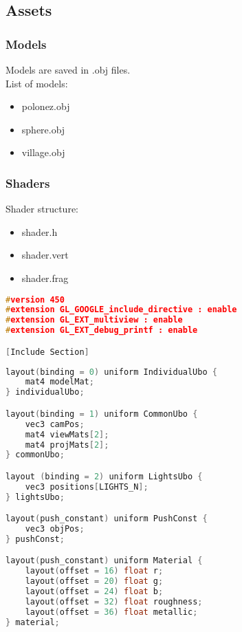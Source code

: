 \subsection{Assets}
\subsubsection{Models}
Models are saved in .obj files.\\
List of models:
\begin{itemize} %
    \item polonez.obj
    \item sphere.obj
    \item village.obj
\end{itemize}
\subsubsection{Shaders}
Shader structure:
\begin{itemize}
    \item shader.h
    \item shader.vert
    \item shader.frag
\end{itemize}

\begin{lstlisting}[language=c++, caption=Common Shader preprocessor]
#version 450
#extension GL_GOOGLE_include_directive : enable
#extension GL_EXT_multiview : enable
#extension GL_EXT_debug_printf : enable

[Include Section]
\end{lstlisting}

\begin{lstlisting}[language=c++, caption=Common Shader data]
layout(binding = 0) uniform IndividualUbo {
    mat4 modelMat;
} individualUbo;

layout(binding = 1) uniform CommonUbo {
    vec3 camPos;
    mat4 viewMats[2];
    mat4 projMats[2];
} commonUbo;

layout (binding = 2) uniform LightsUbo {
    vec3 positions[LIGHTS_N];
} lightsUbo;

layout(push_constant) uniform PushConst {
    vec3 objPos;
} pushConst;

layout(push_constant) uniform Material {
    layout(offset = 16) float r;
    layout(offset = 20) float g;
    layout(offset = 24) float b;
    layout(offset = 32) float roughness;
    layout(offset = 36) float metallic;
} material;
\end{lstlisting}

